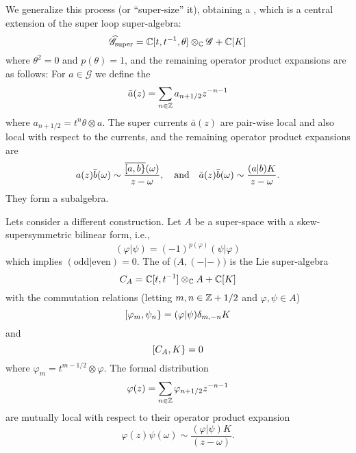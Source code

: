 \M
We generalize this process (or ``super-size'' it), obtaining
a , which is a central extension of the super
loop super-algebra:
\begin{equation}
\widehat{\mathscr{G}}_{\text{super}}=\mathbb{C}[t,t^{-1},\theta]\otimes_{\mathbb{C}}\mathscr{G}+\mathbb{C}[K]
\end{equation}
where $\theta^2=0$ and $p(\theta)=1$, and the remaining operator product
expansions are as follows: For $a\in\mathscr{G}$ we define
the 
\begin{equation}
\bar{a}(z)=\sum_{n\in\mathbb{Z}}a_{n+1/2}z^{-n-1}
\end{equation}
where $a_{n+1/2}=t^{n}\theta\otimes a$. The super currents $\bar{a}(z)$
are pair-wise local and also local with respect to the currents, and the
remaining operator product expansions are
\begin{equation}
a(z)\bar{b}(\omega)\sim\frac{\overline{[a,b\}}(\omega)}{z-\omega},
\quad\mbox{and}\quad
\bar{a}(z)\bar{b}(\omega)\sim\frac{(a|b)K}{z-\omega}.
\end{equation}
They form a subalgebra.

\M
Lets consider a different construction. Let $A$ be a super-space with a
skew-supersymmetric bilinear form, i.e., 
\begin{equation}
(\varphi|\psi)=(-1)^{p(\varphi)}(\psi|\varphi)
\end{equation}
which implies $(\mbox{odd}|\mbox{even})=0$. The  of $\bigl(A,(-|-)\bigr)$ is the Lie super-algebra
\begin{equation}
C_{A}=\mathbb{C}[t,t^{-1}]\otimes_{\mathbb{C}}A + \mathbb{C}[K]
\end{equation}
with the commutation relations (letting $m,n\in\mathbb{Z}+1/2$ and
$\varphi,\psi\in A$)
\begin{equation}
[\varphi_{m},\psi_{n}\}=(\varphi|\psi)\delta_{m,-n}K
\end{equation}
and
\begin{equation}
[C_{A},K\}=0
\end{equation}
where $\varphi_{m}=t^{m-1/2}\otimes\varphi$. The formal distribution 
\begin{equation}
\varphi(z)=\sum_{n\in\mathbb{Z}}\varphi_{n+1/2}z^{-n-1}
\end{equation}
are mutually local with respect to their operator product expansion
\begin{equation}
\varphi(z)\psi(\omega)\sim\frac{(\varphi|\psi)K}{(z-\omega)}.
\end{equation}

